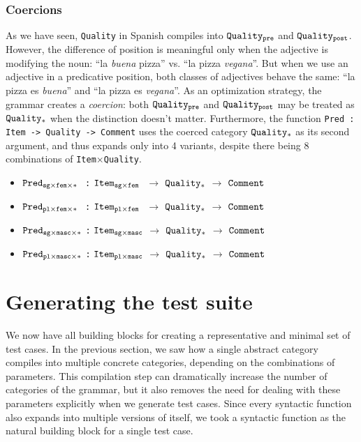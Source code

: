 \documentclass[runningheads]{llncs}
\def\t#1{\texttt{#1}}
\newcommand{\quality}[1]{${\tt Quality_{#1}}$}
\newcommand{\comment}{${\tt Comment}$}
\newcommand{\pred}[3]{${\tt Pred_{#1\times#2\times#3}}$}
\newcommand{\itemSpa}[2]{${\tt Item_{#1\times#2}}$}
\begin{document}
\subsubsection{Coercions}
\label{sec:Coercions}
As we have seen, \t{Quality} in Spanish compiles into \quality{pre} and
\quality{post}. However, the difference of position is meaningful only when the
adjective is modifying the noun: ``la \emph{buena} pizza'' vs. ``la pizza
\emph{vegana}''. But when we use an adjective in a predicative position, both
classes of adjectives behave the same: ``la pizza es \emph{buena}''
and ``la pizza es \emph{vegana}''. As an optimization strategy, the
grammar creates a {\it coercion}: both \quality{pre} and \quality{post}
may be treated as \quality{*} when the distinction doesn't matter. 
Furthermore, the function \t{Pred : Item -> Quality -> Comment} uses
the coerced category \quality{*} as its second argument, and thus
expands only into 4 variants, despite there being 8 combinations of
\t{Item}$\times$\t{Quality}.

\begin{itemize}
\item \pred{sg}{fem}{*~} \t{:} \itemSpa{sg}{fem~} $\rightarrow$ \quality{*} $\rightarrow$ \comment
\item  \pred{pl}{fem}{*~} \t{:} \itemSpa{pl}{fem~} $\rightarrow$ \quality{*} $\rightarrow$ \comment
\item  \pred{sg}{masc}{*} \t{:} \itemSpa{sg}{masc} $\rightarrow$ \quality{*} $\rightarrow$ \comment
\item \pred{pl}{masc}{*} \t{:} \itemSpa{pl}{masc} $\rightarrow$ \quality{*} $\rightarrow$ \comment
\end{itemize}

\section{Generating the test suite}

We now have all building blocks for creating a representative and
minimal set of test cases.
In the previous section, we saw how a single abstract category
compiles into multiple concrete categories, depending on the
combinations of parameters. This compilation step can dramatically
increase the number of categories of the grammar, but it also removes
the need for dealing with these parameters explicitly when we generate
test cases. Since every syntactic function also expands into multiple
versions of itself, we took a syntactic function as the natural
building block for a single test case.
\end{document}
